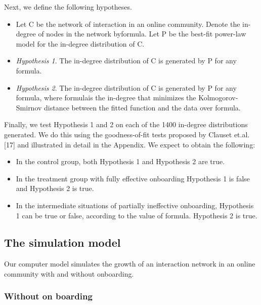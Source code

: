 Next, we define the following hypotheses. 

\begin{itemize}
\item Let C be the network of interaction in an online community. Denote the in-degree of nodes in the network byformula. Let P be the best-fit power-law model for the in-degree distribution of C.
\item \emph{Hypothesis 1}. The in-degree distribution of C is generated by P for any formula.
\item \emph{Hypothesis 2}. The in-degree distribution of C is generated by P for any formula, where formulais the in-degree that minimizes the Kolmogorov-Smirnov distance between the fitted function and the data over formula.
\end{itemize}

Finally, we test Hypothesis 1 and 2 on each of the 1400 in-degree distributions generated. We do this using the goodness-of-fit tests proposed by Clauset et.al. [17] and illustrated in detail in the Appendix.
We expect to obtain the following:

\begin{itemize}
\item In the control group, both Hypothesis 1 and Hypothesis 2 are true. 
\item In the treatment group with fully effective onboarding Hypothesis 1 is false and Hypothesis 2 is true. 
\item In the intermediate situations of partially ineffective onboarding, Hypothesis 1 can be true or false, according to the value of formula. Hypothesis 2 is true.
\end{itemize}


\subsection{The simulation model}

Our computer model simulates the growth of an interaction network in an online community with and without onboarding.  

\subsubsection*{Without on boarding}

